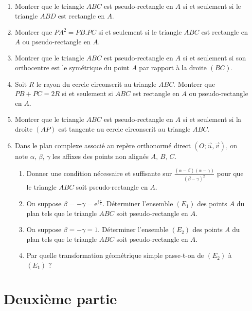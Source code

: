 \documentclass[landscape,twocolumn,leqno,a4paper,10pt]{report} %
\newcommand{\e}{\mathrm{e}}
\begin{document}
\begin{enumerate}
	\item Montrer que le triangle $A B C$ est pseudo-rectangle en $A$ si et seulement si le triangle $A B D$ est rectangle en $A$.
	\item Montrer que $P A^{2}=P B . P C$ si et seulement si le triangle $A B C$ est rectangle en $A$ ou pseudo-rectangle en $A$.
	\item Montrer que le triangle $A B C$ est pseudo-rectangle en $A$ si et seulement si son orthocentre est le symétrique du point $A$ par rapport à la droite $(B C)$.
	\item Soit $R$ le rayon du cercle circonscrit au triangle $A B C$. Montrer que $P B+P C=2 R$ si et seulement si $A B C$ est rectangle en $A$ ou pseudo-rectangle en $A$.
	\item Montrer que le triangle $A B C$ est pseudo-rectangle en $A$ si et seulement si la droite $(A P)$ est tangente au cercle circonscrit au triangle $A B C$.
	\item Dans le plan complexe associé au repère orthonormé direct $(O ; \vec{u}, \vec{v})$, on note $\alpha$, $\beta$, $\gamma$ les affixes des points non alignés $A$, $B$, $C$.
	\begin{enumerate}
		\item Donner une condition nécessaire et suffisante sur $\frac{(\alpha-\beta)(\alpha-\gamma)}{(\beta-\gamma)^{2}}$ pour que le triangle $A B C$ soit pseudo-rectangle en $A$.
		\item On suppose $\beta=-\gamma=\e^{i \frac{\pi}{4}}$. Déterminer l'ensemble $\left(E_{1}\right)$ des points $A$ du plan tels que le triangle $A B C$ soit pseudo-rectangle en $A$.
		\item On suppose $\beta=-\gamma=1$. Déterminer l'ensemble $\left(E_{2}\right)$ des points $A$ du plan tels que le triangle $A B C$ soit pseudo-rectangle en $A$.
		\item Par quelle transformation géométrique simple passe-t-on de $\left(E_{2}\right)$ à $\left(E_{1}\right)$ ?
	\end{enumerate}
\end{enumerate}

\newpage

\section{Deuxième partie}
\end{document}
